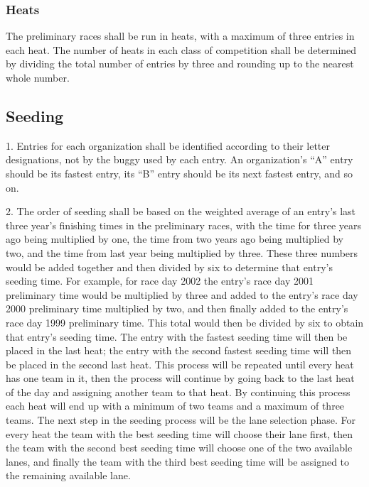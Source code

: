 \subsubsection{Heats}

The preliminary races shall be run in heats, with a maximum of three entries in each heat. The number of heats in each class of competition shall be determined by dividing the total number of entries by three and rounding up to the nearest whole number.

\subsection{Seeding}

1. Entries for each organization shall be identified according to their letter designations, not by the buggy used by each entry. An organization’s “A” entry should be its fastest entry, its “B” entry should be its next fastest entry, and so on.

2. The order of seeding shall be based on the weighted average of an entry’s last three year’s finishing times in the preliminary races, with the time for three years ago being multiplied by one, the time from two years ago being multiplied by two, and the time from last year being multiplied by three. These three numbers would be added together and then divided by six to determine that entry’s seeding time. For example, for race day 2002 the entry’s race day 2001 preliminary time would be multiplied by three and added to the entry’s race day 2000 preliminary time multiplied by two, and then finally added to the entry’s race day 1999 preliminary time. This total would then be divided by six to obtain that entry’s seeding time. The entry with the fastest seeding time will then be placed in the last heat; the entry with the second fastest seeding time will then be placed in the second last heat. This process will be repeated until every heat has one team in it, then the process will continue by going back to the last heat of the day and assigning another team to that heat. By continuing this process each heat will end up with a minimum of two teams and a maximum of three teams. The next step in the seeding process will be the lane selection phase. For every heat the team with the best seeding time will choose their lane first, then the team with the second best seeding time will choose one of the two available lanes, and finally the team with the third best seeding time will be assigned to the remaining available lane.

